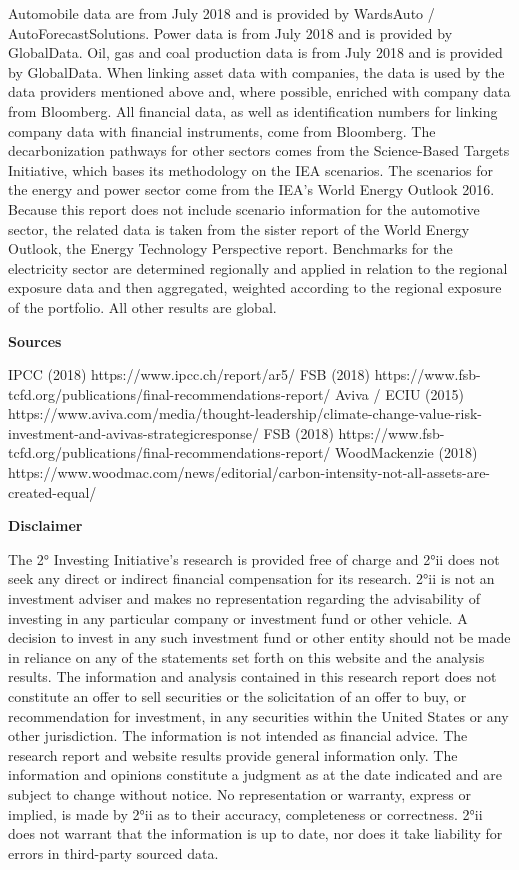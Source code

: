 \documentclass[10pt,twoside,table]{article}\usepackage[]{graphicx}\usepackage[]{color}
\begin{document}
Automobile data are from July 2018 and is provided by WardsAuto / AutoForecastSolutions. Power data is from July 2018 and is provided by GlobalData. Oil, gas and coal production data is from July 2018 and is provided by GlobalData. When linking asset data with companies, the data is used by the data providers mentioned above and, where possible, enriched with company data from Bloomberg. All financial data, as well as identification numbers for linking company data with financial instruments, come from Bloomberg. The decarbonization pathways for other sectors comes from the Science-Based Targets Initiative, which bases its methodology on the IEA scenarios. The scenarios for the energy and power sector come from the IEA’s World Energy Outlook 2016. Because this report does not include scenario information for the automotive sector, the related data is taken from the sister report of the World Energy Outlook, the Energy Technology Perspective report. Benchmarks for the electricity sector are determined regionally and applied in relation to the regional exposure data and then aggregated, weighted according to the regional exposure of the portfolio. All other results are global.

\textbf{Sources}

IPCC (2018) https://www.ipcc.ch/report/ar5/
FSB (2018) https://www.fsb-tcfd.org/publications/final-recommendations-report/
Aviva / ECIU (2015) https://www.aviva.com/media/thought-leadership/climate-change-value-risk-investment-and-avivas-strategicresponse/
FSB (2018) https://www.fsb-tcfd.org/publications/final-recommendations-report/
WoodMackenzie (2018) https://www.woodmac.com/news/editorial/carbon-intensity-not-all-assets-are-created-equal/ 

\textbf{Disclaimer}

The 2° Investing Initiative’s research is provided free of charge and 2°ii does not seek any direct or indirect financial compensation for its research. 2°ii is not an investment adviser and makes no representation regarding the advisability of investing in any particular company or investment fund or other vehicle. A decision to invest in any such investment fund or other entity should not be made in reliance on any of the statements set forth on this website and the analysis results. The information and analysis contained in this research report does not constitute an offer to sell securities or the solicitation of an offer to buy, or recommendation for investment, in any securities within the United States or any other jurisdiction. The information is not intended as financial advice. The research report and website results provide general information only. The information and opinions constitute a judgment as at the date indicated and are subject to change without notice. No representation or warranty, express or implied, is made by 2°ii as to their accuracy, completeness or correctness. 2°ii does not warrant that the information is up to date, nor does it take liability for errors in third-party sourced data.
\end{document}
